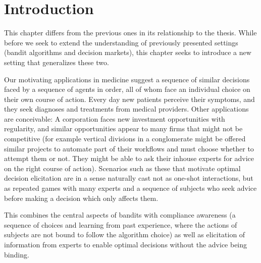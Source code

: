 
\section{Introduction}

This chapter differs from the previous ones in its relationship to the thesis. 
While before we seek to extend the understanding of previously presented settings (bandit algorithms and decision markets), this chapter seeks to introduce a new setting that generalizes these two.



Our motivating applications in medicine suggest a sequence of similar decisions faced by a sequence of agents in order, all of whom face an individual choice on their own course of action.
Every day new patients perceive their symptoms, and they seek diagnoses and treatments from medical providers. Other applications are conceivable:
A corporation faces new investment opportunities with regularity, and similar opportunities appear to many firms that might not be competitive (for example vertical divisions in a conglomerate might be offered similar projects to automate part of their workflows and must choose whether to attempt them or not. They might be able to ask their inhouse experts for advice on the right course of action).
Scenarios such as these that motivate optimal decision elicitation are in a sense naturally cast not as one-shot interactions, but as repeated games with many experts and a sequence of subjects who seek advice before making a decision which only affects them.

This combines the central aspects of bandits with compliance awareness (a sequence of choices and learning from past experience, where the actions of subjects are not bound to follow the algorithm choice) as well as elicitation of information from experts to enable optimal decisions without the advice being binding. 



